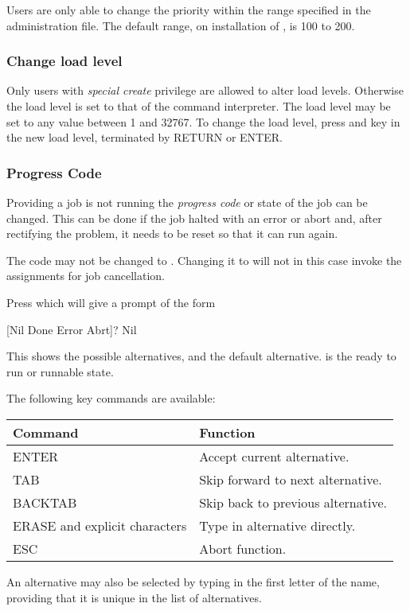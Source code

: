 Users are only able to change the priority within the range specified in
the administration file. The default range, on installation of
\ProductName{}, is 100 to 200.

\subsubsection{Change load level}
Only users with \textit{special create} privilege are allowed to alter
load levels. Otherwise the load level is set to that of the command
interpreter. The load level may be set to any value between 1 and
32767. To change the load level, press  and key
in the new load level, terminated by RETURN or ENTER.

\subsubsection{Progress Code}
Providing a job is not running the \textit{progress code} or state of
the job can be changed. This can be done if the job halted with an
error or abort and, after rectifying the problem, it needs to be reset
so that it can run again.

The code may not be changed to . Changing it
to  will not in this case invoke the
assignments for job cancellation.

Press  which will give a prompt of the form

\begin{expara}

[Nil Done Error Abrt]? Nil

\end{expara}

This shows the possible alternatives, and the default alternative.
 is the ready to run or runnable state.

The following key commands are available:

\begin{center}
\begin{tabular}{|l p{10cm}|}\hline
\bfseries Command &
\bfseries Function\\\hline
ENTER & Accept current alternative.\\\hline
TAB & Skip forward to next alternative.\\\hline
BACKTAB & Skip back to previous alternative.\\\hline
ERASE and explicit characters & Type in alternative directly.\\\hline
ESC & Abort function.\\\hline
\end{tabular}
\end{center}
An alternative may also be selected by typing in the first letter of the
name, providing that it is unique in the list of alternatives.

